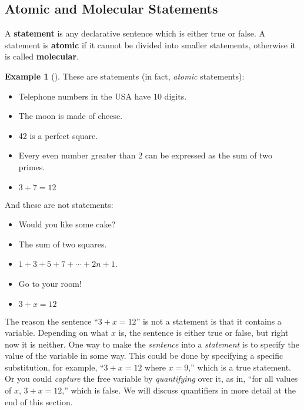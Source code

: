 \documentclass[12pt,]{book}
\newcommand{\terminology}[1]{\textbf{#1}}
\theoremstyle{plain}
\theoremstyle{definition}
\theoremstyle{definition}
\newtheorem{example}[theorem]{Example}
\theoremstyle{definition}
\numberwithin{equation}{chapter}
\begin{document}
\subsection[{Atomic and Molecular Statements}]{Atomic and Molecular Statements}\label{atomic-molecular-statements}
\hypertarget{p-1027}{}%
A \terminology{statement} is any declarative sentence which is either true or false. A statement is \terminology{atomic} if it cannot be divided into smaller statements, otherwise it is called \terminology{molecular}.%
\begin{example}[]\label{example-47}
\hypertarget{p-1028}{}%
These are statements (in fact, \emph{atomic} statements): \leavevmode%
\begin{itemize}[label=\textbullet]
\item{}\hypertarget{p-1029}{}%
Telephone numbers in the USA have 10 digits.%
\item{}\hypertarget{p-1030}{}%
The moon is made of cheese.%
\item{}\hypertarget{p-1031}{}%
42 is a perfect square.%
\item{}\hypertarget{p-1032}{}%
Every even number greater than 2 can be expressed as the sum of two primes.%
\item{}\hypertarget{p-1033}{}%
\(3+7 = 12\)%
\end{itemize}
 And these are not statements: \leavevmode%
\begin{itemize}[label=\textbullet]
\item{}\hypertarget{p-1034}{}%
Would you like some cake?%
\item{}\hypertarget{p-1035}{}%
The sum of two squares.%
\item{}\(1+3+5+7+\cdots+2n+1\).%
\item{}\hypertarget{p-1036}{}%
Go to your room!%
\item{}\hypertarget{p-1037}{}%
\(3+x = 12\)%
\end{itemize}
%
\end{example}
\hypertarget{p-1038}{}%
The reason the sentence ``\(3 + x = 12\)'' is not a statement is that it contains a variable. Depending on what \(x\) is, the sentence is either true or false, but right now it is neither. One way to make the \emph{sentence} into a \emph{statement} is to specify the value of the variable in some way. This could be done by specifying a specific substitution, for example, ``\(3+x = 12\) where \(x = 9\),'' which is a true statement.  Or you could \emph{capture} the free variable by \emph{quantifying} over it, as in, ``for all values of \(x\), \(3+x = 12\),'' which is false. We will discuss quantifiers in more detail at the end of this section.%
\end{document}
